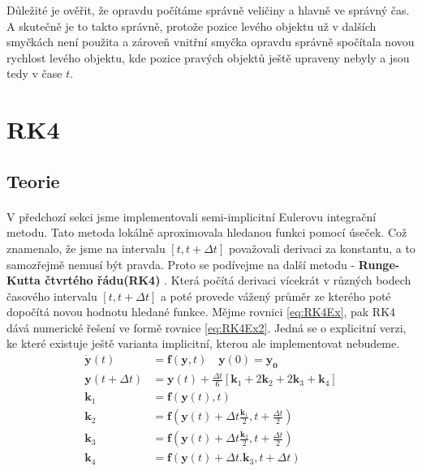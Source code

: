 Důležité je ověřit, že opravdu počítáme správně veličiny a hlavně ve správný čas. A skutečně je to takto správně, protože pozice levého objektu už v dalších smyčkách není použita a zároveň vnitřní smyčka opravdu správně spočítala novou rychlost levého objektu, kde pozice pravých objektů ještě upraveny nebyly a jsou tedy v čase $ t $.


\section{RK4}
\label{sec:implRK4}
\subsection{Teorie}
\paragraph{}

V předchozí sekci jsme implementovali semi-implicitní Eulerovu integrační metodu. Tato metoda lokálně aproximovala hledanou funkci pomocí úseček. Což znamenalo, že jsme na intervalu $ \left[ t,t+\Delta t\right]  $ považovali derivaci za konstantu, a to samozřejmě nemusí být pravda. Proto se podívejme na další metodu -  \textbf{Runge-Kutta čtvrtého řádu(RK4)} . Která počítá derivaci vícekrát v různých bodech časového intervalu $ \left[ t,t+\Delta t\right]  $ a poté provede vážený průměr ze kterého poté dopočítá novou hodnotu hledané funkce. Mějme rovnici \eqref{eq:RK4Ex}, pak RK4 dává numerické řešení ve formě rovnice \eqref{eq:RK4Ex2}. Jedná se o explicitní verzi, ke které existuje ještě varianta implicitní, kterou ale implementovat nebudeme.
\begin{align}
\label{eq:RK4Ex}
\boldsymbol{\dot y} (t) &= \boldsymbol{f}(\boldsymbol{y},t) \quad \boldsymbol{y}(0)=\boldsymbol{y_0}\\
\label{eq:RK4Ex2}
\boldsymbol{y}(t + \Delta t) &= \boldsymbol{y}(t) + \frac{\Delta t}{6}\left[ \boldsymbol{k}_1 + 2\boldsymbol{k}_2 + 2\boldsymbol{k}_3 + \boldsymbol{ k}_4\right] \\
\boldsymbol{k}_1 &= \boldsymbol{f}(\boldsymbol{y}(t),t)\nonumber\\
\boldsymbol{k}_2 &= \boldsymbol{f}(\boldsymbol{y}(t) + \Delta t\frac{\boldsymbol{k}_1}{2}, t+\frac{\Delta t}{2})\nonumber \\
\boldsymbol{k}_3 &= \boldsymbol{f}(\boldsymbol{y}(t) + \Delta t\frac{\boldsymbol{k}_2}{2}, t+\frac{\Delta t}{2})\nonumber \\
\boldsymbol{k}_4 &= \boldsymbol{f}(\boldsymbol{y}(t) + \Delta t. \boldsymbol{k}_3, t+\Delta t)\nonumber
\end{align}

